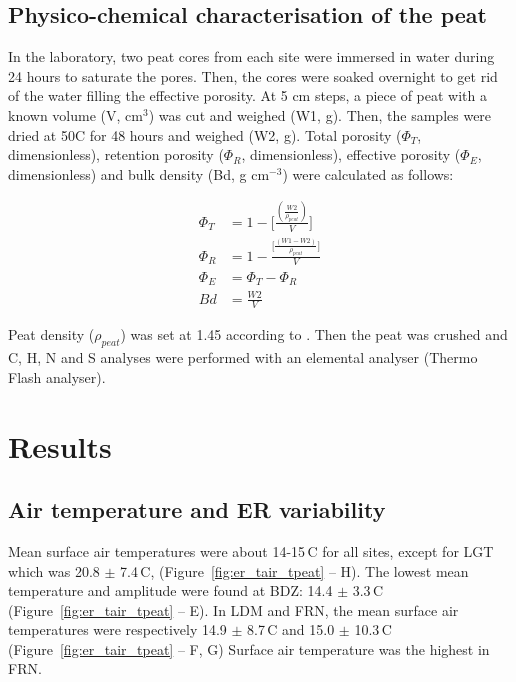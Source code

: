 \subsection{Physico-chemical characterisation of the peat}

In the laboratory, two peat cores from each site were immersed in water during 24 hours to saturate the pores. 
Then, the cores were soaked overnight to get rid of the water filling the effective porosity. 
At 5 cm steps, a piece of peat with a known volume (V, cm$^{3}$) was cut and weighed (W1, g). 
Then, the samples were dried at 50\textdegree C for 48 hours and weighed (W2, g). 
Total porosity ($\Phi_{T}$, dimensionless), retention porosity ($\Phi_{R}$, dimensionless), effective porosity ($\Phi_{E}$, dimensionless) and bulk density (Bd, g cm$^{-3}$) were calculated as follows:

\begin{align}
\Phi_{T} & = 1 - \bigg[\frac{(\frac{W2}{\rho_{peat}})}{V}\bigg] \label{eq_por_tot}\\
\Phi_{R} & = 1 - \frac{\Big[\frac{(W1-W2)}{\rho_{peat}}\Big]}{V} \label{eq_por_ret}\\
\Phi_{E} & = \Phi_{T} - \Phi_{R} \label{eq_pro_eff}\\
Bd & = \frac{W2}{V} \label{eq_bd}
\end{align}

Peat density ($\rho_{peat}$) was set at 1.45 according to \citet{Kennedy2005}.
Then the peat was crushed and C, H, N and S analyses were performed with an elemental analyser (Thermo Flash analyser). 
%


\section{Results}

\subsection{Air temperature and ER variability}

Mean surface air temperatures were about 14-15\,\textdegree C for all sites, except for LGT which was 20.8 $\pm$ 7.4\,\textdegree C, (Figure~\ref{fig:er_tair_tpeat} -- H).
The lowest mean temperature and amplitude were found at BDZ: 14.4 $\pm$ 3.3\,\textdegree C (Figure~\ref{fig:er_tair_tpeat} -- E).
In LDM and FRN, the mean surface air temperatures were respectively 14.9 $\pm$ 8.7\,\textdegree C and 15.0 $\pm$ 10.3\,\textdegree C (Figure~\ref{fig:er_tair_tpeat} -- F, G)
Surface air temperature was the highest in FRN.

